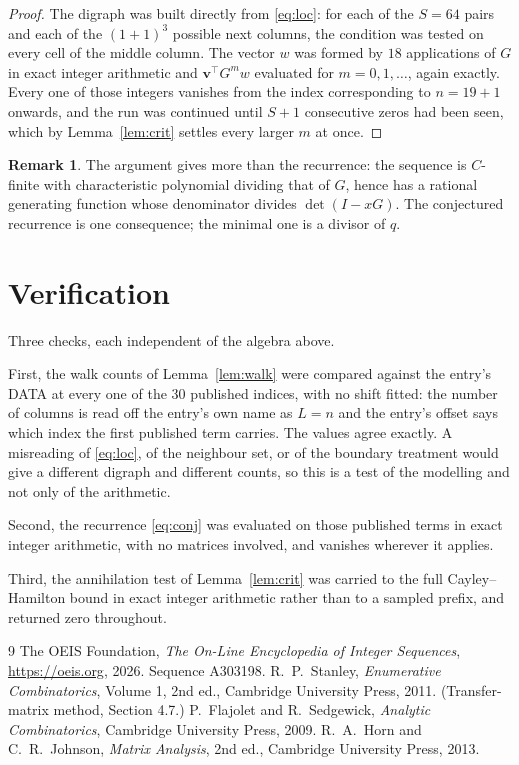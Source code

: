 \documentclass[11pt,a4paper]{article}
\theoremstyle{plain}
\theoremstyle{definition}
\newtheorem{remark}[theorem]{Remark}
\begin{document}
\begin{proof}
The digraph was built directly from \eqref{eq:loc}: for each of the $S=64$ pairs and each
of the $(1+1)^{3}$ possible next columns, the condition was tested on every cell of
the middle column. The vector $w$ was formed by $18$ applications of $G$ in exact integer
arithmetic and $\mathbf{v}^{\!\top}G^{m}w$ evaluated for $m=0,1,\dots$, again exactly.
Every one of those integers vanishes from the index corresponding to $n=19+1$ onwards,
and the run was continued until $S+1$ consecutive zeros had been seen, which by
Lemma~\ref{lem:crit} settles every larger $m$ at once.
\end{proof}

\begin{remark}
The argument gives more than the recurrence: the sequence is $C$-finite with characteristic
polynomial dividing that of $G$, hence has a rational generating function whose denominator
divides $\det(I-xG)$. The conjectured recurrence is one consequence; the minimal one is a
divisor of $q$.
\end{remark}

\section{Verification}

Three checks, each independent of the algebra above.

First, the walk counts of Lemma~\ref{lem:walk} were compared against the entry's DATA at
every one of the $30$ published indices, with no shift fitted: the number of columns is
read off the entry's own name as $L=n$ and the entry's offset says which index the first
published term carries. The values agree exactly. A misreading of \eqref{eq:loc}, of the
neighbour set, or of the boundary treatment would give a different digraph and different
counts, so this is a test of the modelling and not only of the arithmetic.

Second, the recurrence \eqref{eq:conj} was evaluated on those published terms in exact
integer arithmetic, with no matrices involved, and vanishes wherever it applies.

Third, the annihilation test of Lemma~\ref{lem:crit} was carried to the full
Cayley--Hamilton bound in exact integer arithmetic rather than to a sampled prefix, and
returned zero throughout.

\begin{thebibliography}{9}
 The OEIS Foundation, \emph{The On-Line Encyclopedia of Integer
Sequences}, \url{https://oeis.org}, 2026. Sequence A303198.
 R.~P.~Stanley, \emph{Enumerative Combinatorics}, Volume 1, 2nd ed.,
Cambridge University Press, 2011. (Transfer-matrix method, Section 4.7.)
 P.~Flajolet and R.~Sedgewick, \emph{Analytic Combinatorics}, Cambridge
University Press, 2009.
 R.~A.~Horn and C.~R.~Johnson, \emph{Matrix Analysis}, 2nd ed., Cambridge
University Press, 2013.
\end{thebibliography}
\end{document}
